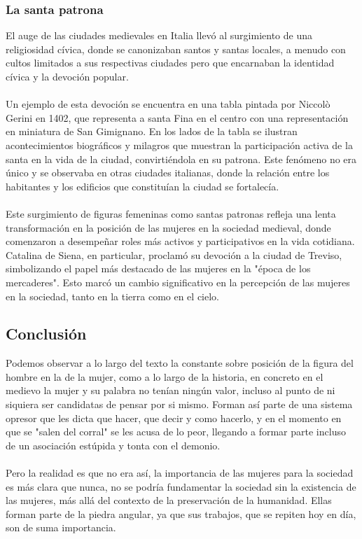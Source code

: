 \documentclass{report}
\begin{document}
\subsubsection{La santa patrona}
El auge de las ciudades medievales en Italia llevó al surgimiento de una religiosidad cívica, donde se canonizaban santos y santas locales, a menudo con cultos limitados a sus respectivas ciudades pero que encarnaban la identidad cívica y la devoción popular.
\\\\
Un ejemplo de esta devoción se encuentra en una tabla pintada por Niccolò Gerini en 1402, que representa a santa Fina en el centro con una representación en miniatura de San Gimignano. En los lados de la tabla se ilustran acontecimientos biográficos y milagros que muestran la participación activa de la santa en la vida de la ciudad, convirtiéndola en su patrona. Este fenómeno no era único y se observaba en otras ciudades italianas, donde la relación entre los habitantes y los edificios que constituían la ciudad se fortalecía.
\\\\
Este surgimiento de figuras femeninas como santas patronas refleja una lenta transformación en la posición de las mujeres en la sociedad medieval, donde comenzaron a desempeñar roles más activos y participativos en la vida cotidiana. Catalina de Siena, en particular, proclamó su devoción a la ciudad de Treviso, simbolizando el papel más destacado de las mujeres en la "época de los mercaderes". Esto marcó un cambio significativo en la percepción de las mujeres en la sociedad, tanto en la tierra como en el cielo.
\subsection{Conclusión}
Podemos observar a lo largo del texto la constante sobre posición de la figura del hombre en la de la mujer, como a lo largo de la historia, en concreto en el medievo la mujer y su palabra no tenían ningún valor, incluso al punto de ni siquiera ser candidatas de pensar por si mismo. Forman así parte de una sistema opresor que les dicta que hacer, que decir y como hacerlo, y en el momento en que se "salen del corral" se les acusa de lo peor, llegando a formar parte incluso de un asociación estúpida y tonta con el demonio. 
\\\\
Pero la realidad es que no era así, la importancia de las mujeres para la sociedad es más clara que nunca, no se podría fundamentar la sociedad sin la existencia de las mujeres, más allá del contexto de la preservación de la humanidad. Ellas forman parte de la piedra angular, ya que sus trabajos, que se repiten hoy en día, son de suma importancia. 
\end{document}
